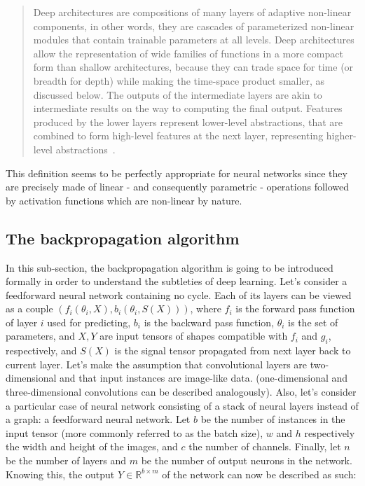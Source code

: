         \begin{quotation}
            Deep architectures are compositions of many layers of adaptive non-linear components,
            in other words, they are cascades of parameterized non-linear modules that contain
            trainable parameters at all levels. Deep architectures allow the representation of wide
            families of functions in a more compact form than shallow architectures, because they
            can trade space for time (or breadth for depth) while making the time-space product
            smaller, as discussed below. The outputs of the intermediate layers are akin to intermediate
            results on the way to computing the final output. Features produced by the lower
            layers represent lower-level abstractions, that are combined to form high-level features
            at the next layer, representing higher-level abstractions~\cite{40d5d7fd62cb44ba934a8a75d4b2b076}.
        \end{quotation}

        This definition seems to be perfectly appropriate for neural networks since they are precisely
        made of linear - and consequently parametric - operations followed by activation functions which
        are non-linear by nature.

    \subsection{The backpropagation algorithm} \label{backpropagation}

        In this sub-section, the backpropagation algorithm is going to be introduced formally in order
        to understand the subtleties of deep learning.
        Let's consider a feedforward neural network containing no cycle.
        Each of its layers can be viewed as a couple $(f_i(\theta_i, X), b_i(\theta_i, S(X)))$,
        where $f_i$ is the forward pass function of layer $i$ used for predicting,
        $b_i$ is the backward pass function, $\theta_i$ is the set of parameters,
        and $X, Y$ are input tensors of shapes compatible with $f_i$ and
        $g_i$, respectively, and $S(X)$ is the signal tensor propagated from next layer back to current layer.
        Let's make the assumption that convolutional layers are two-dimensional and that input instances are image-like data.
        (one-dimensional and three-dimensional convolutions can be described analogously).
        Also, let's consider a particular case of neural network consisting of a stack of neural layers instead of a graph:
        a feedforward neural network.
        Let $b$ be the number of instances in the input tensor (more commonly referred to as the batch size),
        $w$ and $h$ respectively the width and height of the images,
        and $c$ the number of channels. Finally, let $n$ be the number of layers and $m$ be the number of output neurons in the network.
        Knowing this, the output $Y \in \mathbb{R}^{b \times m}$ of the network can now be described as such:

